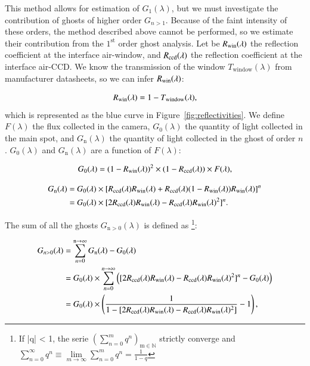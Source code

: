This method allows for estimation of $G_1(\lambda)$, but we must investigate the contribution of ghosts of higher order $G_{n>1}$. Because of the faint intensity of these orders, the method described above cannot be performed, so we estimate their contribution from the $1^{\mathrm{st}}$ order ghost analysis. Let be $R_{\mathrm{win}}(\lambda)$ the reflection coefficient at the interface air-window, and $R_{\mathrm{ccd}}(\lambda)$ the reflection coefficient at the interface air-CCD. We know the transmission of the window $T_\mathrm{window}(\lambda)$ from manufacturer datasheets, so we can infer $R_{\mathrm{win}}(\lambda)$:
 
\begin{equation}
    R_{\mathrm{win}}(\lambda) = 1 - T_\mathrm{window}(\lambda),
    \label{eq:rwindow}
\end{equation}
which is represented as the blue curve in Figure~\ref{fig:reflectivities}. We define $F(\lambda)$ the flux collected in the camera, $G_0(\lambda)$ the quantity of light collected in the main spot, and $G_\mathrm{n}(\lambda)$ the quantity of light collected in the ghost of order $n$. $G_0(\lambda)$ and $G_\mathrm{n}(\lambda)$ are a function of $F(\lambda)$: 

\begin{equation}
     G_0(\lambda) = (1-R_{\mathrm{win}}(\lambda))^{2} \times (1-R_{\mathrm{ccd}}(\lambda)) \times F(\lambda), 
     \label{eq:g0}
\end{equation}

\begin{equation}
\begin{aligned}
    G_\mathrm{n}(\lambda) & = G_{0}(\lambda) \times [R_{\mathrm{ccd}}(\lambda) R_{\mathrm{win}}(\lambda) + R_{\mathrm{ccd}}(\lambda)(1-R_{\mathrm{win}}(\lambda))R_{\mathrm{win}}(\lambda)]^{n} \\
    & = G_{0}(\lambda) \times [2 R_{\mathrm{ccd}}(\lambda) R_{\mathrm{win}}(\lambda) - R_{\mathrm{ccd}}(\lambda) R_{\mathrm{win}}(\lambda)^{2}] ^{n}. \\
     \label{eq:gn}
\end{aligned}
\end{equation}

\noindent The sum of all the ghosts $G_{\mathrm{n>0}}(\lambda)$ is defined as
\footnote{If |q| < 1, the serie $\left( \sum_{n=0}^{m} q^n \right)_{\mathrm{m \in \mathbb{N}}}$ strictly converge and \\ $\sum_{n=0}^{\infty} q^n \equiv \lim\limits_{m \rightarrow \infty} \sum_{n=0}^{m} q^n = \frac{1}{1-q}$}:

 \begin{equation}
 \begin{aligned}
     G_{n>0}(\lambda)&=\sum_{n=0}^{\mathrm{n} \rightarrow \infty} G_\mathrm{n}(\lambda) - G_0(\lambda) \\
     & = G_0(\lambda) \times \sum_{n=0}^{n \rightarrow \infty} \left( [2 R_{\mathrm{ccd}}(\lambda) R_{\mathrm{win}}(\lambda) - R_{\mathrm{ccd}}(\lambda) R_{\mathrm{win}}(\lambda)^{2}] ^{n} - G_0(\lambda) \right)\\
     & = G_0(\lambda) \times\left( \frac{1}{1- [2 R_{\mathrm{ccd}}(\lambda) R_{\mathrm{win}}(\lambda) - R_{\mathrm{ccd}}(\lambda) R_{\mathrm{win}}(\lambda)^{2}]} - 1\right),
     \label{eq:sum_ghost}
 \end{aligned}
 \end{equation}
 
